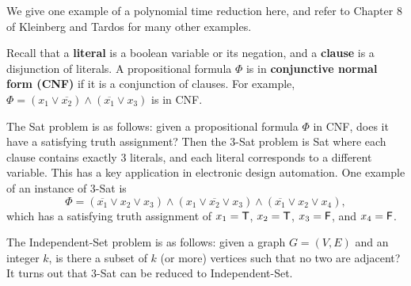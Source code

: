 We give one example of a polynomial time reduction here, and refer to Chapter 
8 of Kleinberg and Tardos for many other examples. 

Recall that a {\bf literal} is a boolean variable or its negation, and a 
{\bf clause} is a disjunction of literals. A propositional formula $\Phi$ is 
in {\bf conjunctive normal form (CNF)} if it is a conjunction of clauses. 
For example, $\Phi = (x_1 \vee \overline{x_2}) \wedge (\overline{x_1} 
\vee x_3)$ is in CNF. 

The {\sc Sat} problem is as follows: given a propositional formula $\Phi$ in 
CNF, does it have a satisfying truth assignment? Then the {\sc $3$-Sat} problem 
is {\sc Sat} where each clause contains exactly $3$ literals, and each literal 
corresponds to a different variable. This has a key application in electronic 
design automation. One example of an instance of {\sc $3$-Sat} is 
\[ \Phi = (\overline{x_1} \vee x_2 \vee x_3) \wedge (x_1 \vee \overline{x_2} 
\vee x_3) \wedge (\overline{x_1} \vee x_2 \vee x_4), \] 
which has a satisfying truth assignment of $x_1 = {\sf T}$, $x_2 = {\sf T}$, 
$x_3 = {\sf F}$, and $x_4 = {\sf F}$. 

The {\sc Independent-Set} problem is as follows: given a graph $G = (V, E)$ 
and an integer $k$, is there a subset of $k$ (or more) vertices such that 
no two are adjacent? It turns out that {\sc $3$-Sat} can be reduced to 
{\sc Independent-Set}. 

